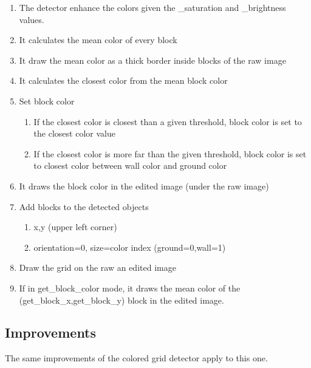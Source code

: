     \begin{enumerate}
        \item The detector enhance the colors given the \_saturation and 
            \_brightness values.
        \item It calculates the mean color of every block
        \item It draw the mean color as a thick border inside blocks of 
            the raw image
        \item It calculates the closest color from the mean block color
        \item Set block color
        \begin{enumerate}
            \item If the closest color is closest than a given threshold, 
                block color is set to the closest color value
            \item If the closest color is more far than the given 
                threshold, block color is set to closest color between 
                wall color and ground color
        \end{enumerate}
        \item It draws the block color in the edited image (under the 
            raw image)
        \item Add blocks to the detected objects
        \begin{enumerate}
            \item x,y (upper left corner)
            \item orientation=0, size=color index (ground=0,wall=1)
        \end{enumerate}
        \item Draw the grid on the raw an edited image
        \item If in get\_block\_color mode, it draws the mean color of 
            the (get\_block\_x,get\_block\_y) block in the edited image.
    \end{enumerate}

\subsection{Improvements}

The same improvements of the colored grid detector apply to this one.

